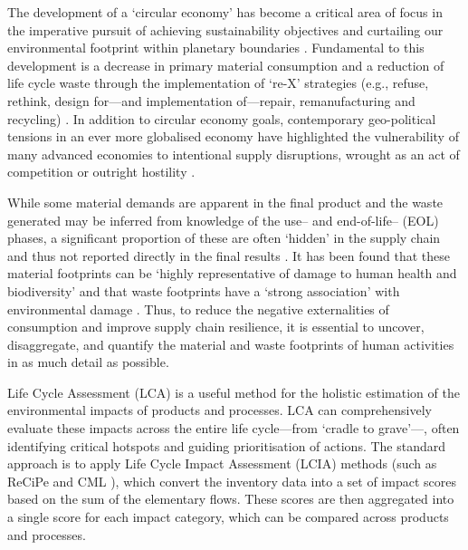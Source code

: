 The development of a `circular economy' has become a critical area of focus in the imperative pursuit of achieving sustainability objectives and curtailing our environmental footprint within planetary boundaries \citep{eu2019greendeal, eu2020circ,nl2023ceplan,nl2016ceplan,pardo2018ce,ellenmacarthur2015ce}. Fundamental to this development is a decrease in primary material consumption and a reduction of life cycle waste through the implementation of `re-X' strategies (e.g., refuse, rethink, design for---and implementation of---repair, remanufacturing and recycling) \citep{eu2022ecodesign, eu2022repair,eu2015reman}. In addition to circular economy goals, contemporary geo-political tensions in an ever more globalised economy have highlighted the vulnerability of many advanced economies to intentional supply disruptions, wrought as an act of competition or outright hostility \citep{jrc2023supplychain,hartley2024cepolitics,berry2023crm}.

While some material demands are apparent in the final product and the waste generated may be inferred from knowledge of the use-- and end-of-life-- (EOL) phases, a significant proportion of these are often `hidden' in the supply chain and thus not reported directly in the final results \citep{laurenti2016wastefootprint,salviulo2021supplychain}. It has been found that these material footprints can be `highly representative of damage to human health and biodiversity' \citep{steinmann2017resourcefootprints} and that waste footprints have a `strong association' with environmental damage \citep{laurenti2023wastefootprint}. Thus, to reduce the negative externalities of consumption and improve supply chain resilience, it is essential to uncover, disaggregate, and quantify the material and waste footprints of human activities in as much detail as possible.


Life Cycle Assessment (LCA) is a useful method for the holistic estimation of the environmental impacts of products and processes. LCA can comprehensively evaluate these impacts across the entire life cycle---from `cradle to grave'---, often identifying critical hotspots and guiding prioritisation of actions. The standard approach is to apply Life Cycle Impact Assessment (LCIA) methods (such as ReCiPe \citep{huijbregts2016recipe} and CML \citep{guinee2002cml}), which convert the inventory data into a set of impact scores based on the sum of the elementary flows. These scores are then aggregated into a single score for each impact category, which can be compared across products and processes.

